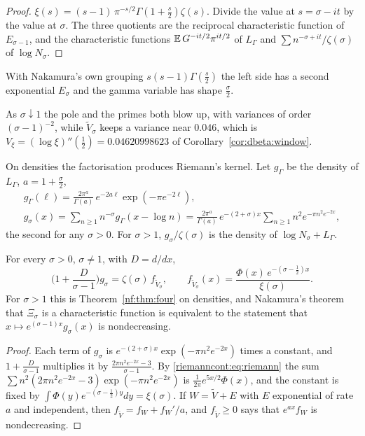 \begin{proof}
$\xi(s)=(s-1)\,\pi^{-s/2}\Gamma(1+\frac s2)\zeta(s)$. Divide the value at $s=\sigma-it$ by the value at $\sigma$. The three quotients are the reciprocal characteristic function of $E_{\sigma-1}$, and the characteristic functions $\mathbb{E}\,G^{-it/2}\pi^{it/2}$ of $L_\Gamma$ and $\sum n^{-\sigma+it}/\zeta(\sigma)$ of $\log N_\sigma$.
\end{proof}

With Nakamura's own grouping $s(s-1)\Gamma(\frac s2)$ the left side has a second exponential $E_\sigma$ and the gamma variable has shape $\frac\sigma2$.

As $\sigma\downarrow1$ the pole and the primes both blow up, with variances of order $(\sigma-1)^{-2}$, while $\tilde V_\sigma$ keeps a variance near $0.046$, which is $V_\xi=(\log\xi)''(\frac12)=0.04620998623$ of Corollary~\ref{cor:dbeta:window}.

On densities the factorisation produces Riemann's kernel. Let $g_\Gamma$ be the density of $L_\Gamma$, $a=1+\frac\sigma2$,
\begin{multline*}
g_\Gamma(\ell)=\frac{2\pi^{a}}{\Gamma(a)}\,e^{-2a\ell}\exp(-\pi e^{-2\ell}),\\
g_\sigma(x)=\sum_{n\ge1}n^{-\sigma}g_\Gamma(x-\log n)=\frac{2\pi^{a}}{\Gamma(a)}\,e^{-(2+\sigma)x}\sum_{n\ge1}n^2e^{-\pi n^2e^{-2x}},
\end{multline*}
the second for any $\sigma>0$. For $\sigma>1$, $g_\sigma/\zeta(\sigma)$ is the density of $\log N_\sigma+L_\Gamma$.

\begin{theorem}[proved]\label{nf:thm:kernel}
For every $\sigma>0$, $\sigma\ne1$, with $D=d/dx$,
\[
\Big(1+\frac{D}{\sigma-1}\Big)g_\sigma=\zeta(\sigma)\,f_{\tilde V_\sigma},\qquad f_{\tilde V_\sigma}(x)=\frac{\Phi(x)\,e^{-(\sigma-\frac12)x}}{\xi(\sigma)} .
\]
For $\sigma>1$ this is Theorem~\ref{nf:thm:four} on densities, and Nakamura's theorem that $\Xi_\sigma$ is a characteristic function is equivalent to the statement that $x\mapsto e^{(\sigma-1)x}g_\sigma(x)$ is nondecreasing.
\end{theorem}

\begin{proof}
Each term of $g_\sigma$ is $e^{-(2+\sigma)x}\exp(-\pi n^2e^{-2x})$ times a constant, and $1+\frac D{\sigma-1}$ multiplies it by $\frac{2\pi n^2e^{-2x}-3}{\sigma-1}$. By \eqref{riemanncont:eq:riemann} the sum $\sum n^2(2\pi n^2e^{-2x}-3)\exp(-\pi n^2e^{-2x})$ is $\frac1{2\pi}e^{5x/2}\Phi(x)$, and the constant is fixed by $\int\Phi(y)e^{-(\sigma-\frac12)y}dy=\xi(\sigma)$. If $W=\tilde V+E$ with $E$ exponential of rate $a$ and independent, then $f_{\tilde V}=f_W+f_W'/a$, and $f_{\tilde V}\ge0$ says that $e^{ax}f_W$ is nondecreasing.
\end{proof}

